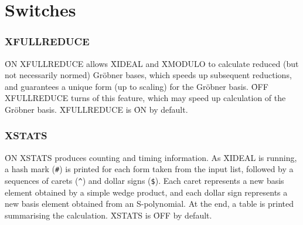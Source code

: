 %


\section{Switches}

\subsubsection*{XFULLREDUCE}

\f{ON XFULLREDUCE} allows \f{XIDEAL} and \f{XMODULO} to calculate reduced
(but not necessarily normed) Gr\"obner bases, which speeds up subsequent
reductions, and guarantees a unique form (up to scaling) for the Gr\"obner
basis. \f{OFF XFULLREDUCE} turns of this feature, which may speed up
calculation of the Gr\"obner basis. \f{XFULLREDUCE} is \f{ON} by default.


%

\subsubsection*{XSTATS}

\f{ON XSTATS} produces counting and timing information. As \f{XIDEAL} is
running, a hash mark (\verb.#.) is printed for each form taken from the
input list, followed by a sequences of carets (\verb.^.) and dollar signs
(\verb.$.). Each caret represents a new basis element obtained by a simple
wedge product, and each dollar sign represents a new basis element obtained
from an S-polynomial. At the end, a table is printed summarising the
calculation. \f{XSTATS} is \f{OFF} by default.

